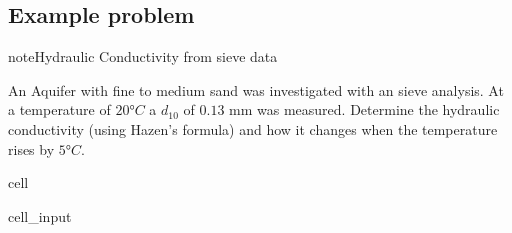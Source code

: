\documentclass[letterpaper,10pt,english]{jupyterBook}
\begin{document}
\subsection{Example problem}
\label{\detokenize{content/flow/L4/14_darcy_law_K:id2}}
\begin{sphinxadmonition}{note}{Hydraulic Conductivity from sieve data}

\sphinxAtStartPar
An Aquifer with fine to medium sand was investigated with an sieve analysis. At a temperature of \(20°C\) a \(d_{10}\) of \(0.13\) mm was measured. Determine the hydraulic conductivity (using Hazen’s formula) and how it changes when the temperature rises by \(5°C\).
\end{sphinxadmonition}

\begin{sphinxuseclass}{cell}\begin{sphinxVerbatimInput}

\begin{sphinxuseclass}{cell_input}
\begin{sphinxVerbatim}[commandchars=\\\{\}]

   
   
   

    

        
        


\end{sphinxVerbatim}
\end{sphinxuseclass}
\end{sphinxVerbatimInput}
\end{sphinxuseclass}
\end{document}
